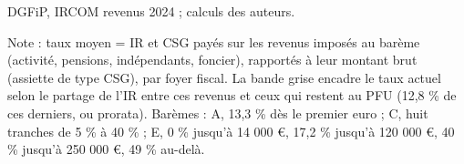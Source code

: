 DGFiP, IRCOM revenus 2024 ; calculs des auteurs.\par Note : taux moyen = IR et CSG payés sur les revenus imposés au barème (activité, pensions, indépendants, foncier), rapportés à leur montant brut (assiette de type CSG), par foyer fiscal. La bande grise encadre le taux actuel selon le partage de l'IR entre ces revenus et ceux qui restent au PFU (12,8 \% de ces derniers, ou prorata). Barèmes : A, 13,3 \% dès le premier euro ; C, huit tranches de 5 \% à 40 \% ; E, 0 \% jusqu'à 14 000 \euro{}, 17,2 \% jusqu'à 120 000 \euro{}, 40 \% jusqu'à 250 000 \euro{}, 49 \% au-delà.
